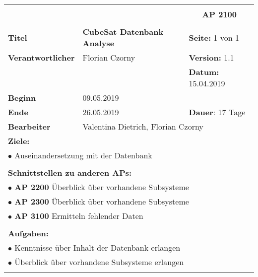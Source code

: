 \clearpage
\begin{table}[!h]
 \begin{center}
  \begin{tabular}{|p{35mm}||p{55mm}|p{50mm}||p{40mm}|}
   \hline
   \multicolumn{3}{|l||}{\textbf{}} & \multicolumn{1}{c|}{}\\
   \multicolumn{3}{|l||}{\textbf{}} & \multicolumn{1}{c|}{\textbf{AP 2100}}\\
   \multicolumn{3}{|l||}{\textbf{}} & \multicolumn{1}{c|}{}\\
   \hline\hline
   \textbf{Titel} & \multicolumn{2}{p{7cm}||}{\textbf{CubeSat Datenbank Analyse}} & \textbf{Seite:} 1 von 1\\
   \hline
   \textbf{Verantwortlicher} & \multicolumn{2}{l||}{Florian Czorny} & \textbf{Version:} 1.1\\
   \hline
   \multicolumn{3}{|l||}{} & \textbf{Datum:} 15.04.2019\\
   \hline\hline
   \textbf{Beginn} & \multicolumn{2}{l||}{09.05.2019} & \\
   \hline
   \textbf{Ende} & \multicolumn{2}{l||}{26.05.2019} & \textbf{Dauer}: 17 Tage\\
   \hline\hline
   \textbf{Bearbeiter} & \multicolumn{3}{l|}{Valentina Dietrich, Florian Czorny}\\
   \hline\hline
   \multicolumn{4}{|p{150mm}|}{\textbf{Ziele:}}\\
   \multicolumn{4}{|p{150mm}|}{$\bullet$ Auseinandersetzung mit der Datenbank }\\
   \multicolumn{4}{|p{150mm}|}{}\\
   \multicolumn{4}{|p{150mm}|}{\textbf{Schnittstellen zu anderen APs:}}\\
   \multicolumn{4}{|p{150mm}|}{$\bullet$ \textbf{AP 2200} Überblick über vorhandene Subsysteme }\\
   \multicolumn{4}{|p{150mm}|}{$\bullet$ \textbf{AP 2300} Überblick über vorhandene Subsysteme }\\
	 \multicolumn{4}{|p{150mm}|}{$\bullet$ \textbf{AP 3100} Ermitteln fehlender Daten}\\
   \multicolumn{4}{|p{150mm}|}{}\\
   \multicolumn{4}{|p{150mm}|}{\textbf{Aufgaben:}}\\
   \multicolumn{4}{|p{150mm}|}{$\bullet$ Kenntnisse über Inhalt der Datenbank erlangen}\\
   \multicolumn{4}{|p{150mm}|}{$\bullet$ Überblick über vorhandene Subsysteme erlangen}\\
   \multicolumn{4}{|p{150mm}|}{}\\
   \hline
  \end{tabular}
 \end{center}
\end{table}

